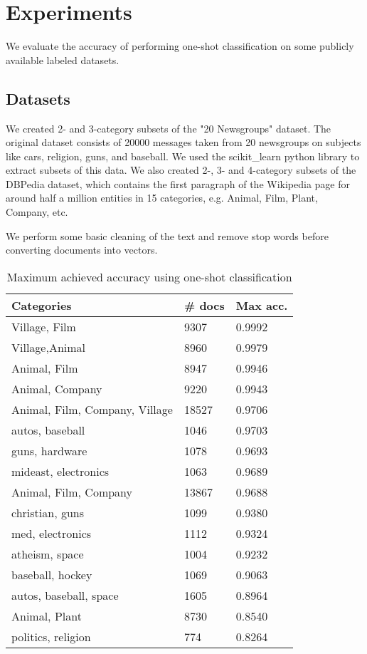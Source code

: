 \section{Experiments}
We evaluate the accuracy of performing one-shot classification on some publicly available labeled datasets.

\subsection{Datasets}
We created 2- and 3-category subsets of the "20 Newsgroups" dataset. The original dataset consists of 20000 messages taken from 20 newsgroups on subjects like cars, religion, guns, and baseball. We used the scikit\_learn python library to extract subsets of this data. We also created 2-, 3- and 4-category subsets of the DBPedia dataset, which contains the first paragraph of the Wikipedia page for around half a million entities in 15 categories, e.g. Animal, Film, Plant, Company, etc.

We perform some basic cleaning of the text and remove stop words before converting documents into vectors.

\begin{table}[]
\centering
\captionsetup{position=bottom}
\begin{tabular}{lll}
\toprule
Categories                  & \# docs & Max acc. \\
\midrule
Village, Film                & 9307         & 0.9992       \\
Village,Animal              & 8960         & 0.9979       \\
Animal, Film                 & 8947         & 0.9946       \\
Animal, Company              & 9220         & 0.9943       \\
Animal, Film, Company, Village & 18527        & 0.9706       \\
autos, baseball              & 1046         & 0.9703       \\
guns, hardware               & 1078         & 0.9693       \\
mideast, electronics         & 1063         & 0.9689       \\
Animal, Film, Company         & 13867        & 0.9688       \\
christian, guns              & 1099         & 0.9380       \\
med, electronics             & 1112         & 0.9324       \\
atheism, space               & 1004         & 0.9232       \\
baseball, hockey             & 1069         & 0.9063       \\
autos, baseball, space        & 1605         & 0.8964       \\
Animal, Plant                & 8730         & 0.8540       \\
politics, religion           & 774          & 0.8264      \\
\bottomrule
\end{tabular}
\caption{Maximum achieved accuracy using one-shot classification}\label{bruteforce}
\end{table}

